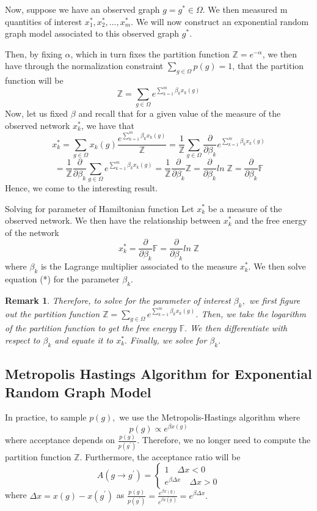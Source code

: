 \documentclass[twoside]{article}
\newtheorem{remark}[theorem]{Remark}
\begin{document}
Now, suppose we have an observed graph $g = g^* \in \Omega.$ We then measured m quantities of interest $x_1^*, x_2^*, ..., x_m^*.$ We will now construct an exponential random graph model associated to this observed graph $g^*.$

Then, by fixing $\alpha$, which in turn fixes the partition function $\mathbb{Z} = e^{-\alpha}$, we then have through the normalization constraint $\sum_{g \in \Omega}p(g) = 1$, that the partition function will be 
$$
\mathbb{Z} = \sum_{g \in \Omega}e^{\sum_{k=1}^{m}\beta_k x_k(g)}
$$
Now, let us fixed $\beta$ and recall that for a given value of the measure of the observed network $x_k^*$, we have that 
$$
x_k^* = \sum_{g \in \Omega}x_k(g)\frac{e^{\sum_{k=1}^{m}\beta_kx_k(g)}}{\mathbb{Z}} = \frac{1}{\mathbb{Z}} \sum_{g \in \Omega}\frac{\partial}{\partial \beta_k}e^{\sum_{k=1}^{m}\beta_kx_k(g)}
$$
$$
= \frac{1}{\mathbb{Z}} \frac{\partial}{\partial \beta_k}\sum_{g \in \Omega}e^{\sum_{k=1}^{m}\beta_kx_k(g)} = \frac{1}{\mathbb{Z}}\frac{\partial}{\partial \beta_k}\mathbb{Z} = \frac{\partial}{\partial \beta_k}ln\;\mathbb{Z} = \frac{\partial}{\partial \beta_k}\mathbb{F}
$$
Hence, we come to the interesting result.
\begin{proposition_exam}{Solving for parameter of Hamiltonian function}{} Let $x_k^*$ be a measure of the observed network. We then have the relationship between $x_k^*$ and the free energy of the network
\begin{equation}
x_k^* = \frac{\partial}{\partial \beta_k}\mathbb{F} = \frac{\partial}{\partial \beta_k}ln\;\mathbb{Z}
\tag{*}
\end{equation}
where $\beta_k$ is the Lagrange multiplier associated to the measure $x_k^*$. We then solve equation (*) for the parameter $\beta_k.$
\end{proposition_exam}

\begin{remark} Therefore, to solve for the parameter of interest $\beta_k,$ we first figure out the partition function $\mathbb{Z} = \sum_{g \in \Omega}e^{\sum_{k=1}^{m}\beta_k x_k(g)}$. Then, we take the logarithm of the partition function to get the free energy $\mathbb{F}.$ We then differentiate with respect to $\beta_k$ and equate it to $x_k^*.$ Finally, we solve for $\beta_k.$
\end{remark}

\subsection{Metropolis Hastings Algorithm for Exponential Random Graph Model}
In practice, to sample $p(g),$ we use the Metropolis-Hastings algorithm where 
$$
p(g) \propto e^{\beta x(g)}
$$
where acceptance depends on $\frac{p(g)}{p(g^{'})}$. Therefore, we no longer need to compute the partition function $\mathbb{Z}.$ Furthermore, the acceptance ratio will be 
$$
A(g \rightarrow g^{'}) = 
\begin{cases}
1 \quad \Delta x < 0\\
e^{\beta \Delta x} \quad \Delta x > 0
\end{cases}
$$
where $\Delta x = x(g) - x(g^{'})$ as $\frac{p(g)}{p(g^{'})} = \frac{e^{\beta x(g)}}{e^{\beta x(g^{'})}} = e^{\beta \Delta x}.$
\end{document}
